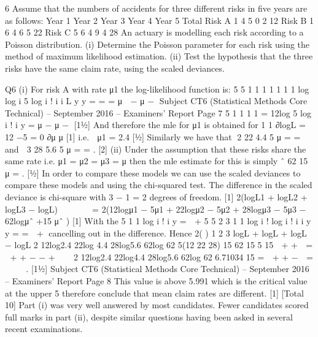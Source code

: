 \documentclass[a4paper,12pt]{article}
\begin{document}
 

6 Assume that the numbers of accidents for three different risks in five years are as
follows:
  Year 1 Year 2 Year 3 Year 4 Year 5 Total
Risk A 1 4 5 0 2 12
Risk B 1 6 4 6 5 22
Risk C 5 6 4 9 4 28
An actuary is modelling each risk according to a Poisson distribution.
(i) Determine the Poisson parameter for each risk using the method of maximum likelihood estimation.
(ii) Test the hypothesis that the three risks have the same claim rate, using the scaled deviances. 

\newpage

\newpage
Q6 (i) For risk A with rate μ1 the log-likelihood function is:
  5 5
1 1 1 1 1
1 1
log log i 5 log i !
  i i
L y y
= =
  = μ  − μ −
Subject CT6 (Statistical Methods Core Technical) – September 2016 – Examiners’ Report
Page 7
5
1 1 1
1
= 12log 5 log i !
  i
y
=
  μ − μ − [1½]
And therefore the mle for μ1 is obtained for
1 1
∂logL = 12 −5 = 0
∂μ μ
[1]
i.e. 
μ1 = 2.4 [½]
Similarly we have that 2
22 4.4
5
μ = = and 
3
28 5.6
5
μ = = . [2]
(ii) Under the assumption that these risks share the same rate i.e. μ1 = μ2 = μ3 = μ
then the mle estimate for this is simply ˆ 62
15
μ = . [½]
In order to compare these models we can use the scaled deviances to compare
these models and using the chi-squared test.
The difference in the scaled deviance is chi-square with 3 − 1 = 2 degrees of
freedom. [1]
2(logL1 + logL2 + logL3 − logL)
     
= 2(12logμ1 − 5μ1 + 22logμ2 − 5μ2 + 28logμ3 − 5μ3 − 62logμˆ +15 μˆ ) [1]
With the
5
1
1
log i !
  i
y
= 
+
  5 5
2 3
1 1
log i ! log i !
  i i
y y
= =
   + cancelling out in the difference.
Hence
2( ) 1 2 3 logL + logL + logL − logL
2 12log2.4 22log 4.4 28log5.6 62log 62 5(12 22 28) 15 62
15 5 15
 + + 
=  + + − − + 
 
2 12log2.4 22log4.4 28log5.6 62log 62 6.71034
15
=  + + −  =  
 
. [1½]
Subject CT6 (Statistical Methods Core Technical) – September 2016 – Examiners’ Report
Page 8
This value is above 5.991 which is the critical value at the upper 5%
therefore conclude that mean claim rates are different. [1]
[Total 10]
Part (i) was very well answered by most candidates. Fewer candidates
scored full marks in part (ii), despite similar questions having been asked in
several recent examinations.
\end{document}
